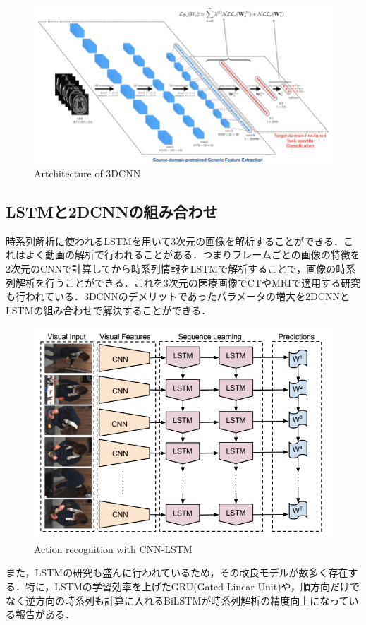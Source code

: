 \begin{figure}[H]
	\centering
	\includegraphics[width=0.7\linewidth]{fig/3d_cnn.png}
	\caption{Artchitecture of 3DCNN}
	\label{fig:3DCNN}
\end{figure}



\subsection{LSTMと2DCNNの組み合わせ}
時系列解析に使われるLSTMを用いて3次元の画像を解析することができる．これはよく動画の解析で行われることがある．つまりフレームごとの画像の特徴を2次元のCNNで計算してから時系列情報をLSTMで解析することで，画像の時系列解析を行うことができる．これを3次元の医療画像でCTやMRIで適用する研究も行われている．3DCNNのデメリットであったパラメータの増大を2DCNNとLSTMの組み合わせで解決することができる．\cite{Donahue_2015_CVPR}

\begin{figure}
	\centering
	\includegraphics[width=0.7\linewidth]{fig/chapter2/cnn_lstm}
	\caption{Action recognition with CNN-LSTM}
	\label{fig:cnnlstm}
\end{figure}

また，LSTMの研究も盛んに行われているため，その改良モデルが数多く存在する．特に，LSTMの学習効率を上げたGRU(Gated Linear Unit)\cite{cho2014learning}や，順方向だけでなく逆方向の時系列も計算に入れるBiLSTM\cite{wang2016image}が時系列解析の精度向上になっている報告がある．

